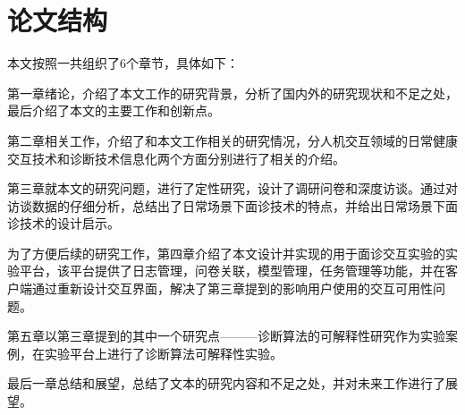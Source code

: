 










\section{论文结构}
本文按照一共组织了6个章节，具体如下：

第一章绪论，介绍了本文工作的研究背景，分析了国内外的研究现状和不足之处，最后介绍了本文的主要工作和创新点。

第二章相关工作，介绍了和本文工作相关的研究情况，分人机交互领域的日常健康交互技术和诊断技术信息化两个方面分别进行了相关的介绍。

第三章就本文的研究问题，进行了定性研究，设计了调研问卷和深度访谈。通过对访谈数据的仔细分析，总结出了日常场景下面诊技术的特点，并给出日常场景下面诊技术的设计启示。

为了方便后续的研究工作，第四章介绍了本文设计并实现的用于面诊交互实验的实验平台，该平台提供了日志管理，问卷关联，模型管理，任务管理等功能，并在客户端通过重新设计交互界面，解决了第三章提到的影响用户使用的交互可用性问题。

第五章以第三章提到的其中一个研究点———诊断算法的可解释性研究作为实验案例，在实验平台上进行了诊断算法可解释性实验。

最后一章总结和展望，总结了文本的研究内容和不足之处，并对未来工作进行了展望。